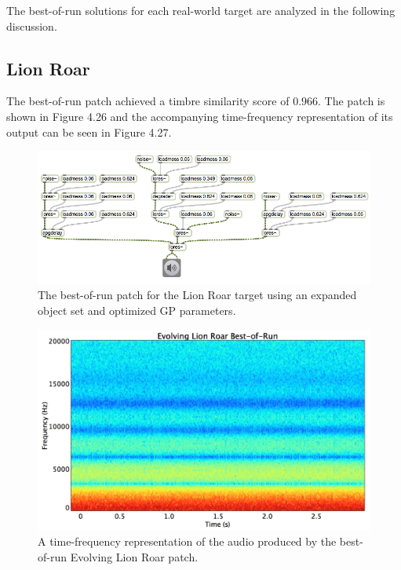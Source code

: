 \documentclass[a4paper,12pt]{report} 	%
\numberwithin{figure}{chapter}
\numberwithin{table}{chapter}
\numberwithin{equation}{chapter}
\begin{document}
\begin{flushleft}
The best-of-run solutions for each real-world target are analyzed in the following discussion.

\subsection{Lion Roar}

The best-of-run patch achieved a timbre similarity score of $0.966$. The patch is shown in Figure 4.26 and the accompanying time-frequency representation of its output can be seen in Figure 4.27.

\begin{figure}[h!]
\begin{center}
\includegraphics[angle = 270, scale = 0.60]{Lion_Best}
\caption[Lion Roar Best-of-Run Patch]{The best-of-run patch for the Lion Roar target using an expanded object set and optimized GP parameters.}
\end{center}
\end{figure}
\begin{figure}[h!]
\begin{center}
\includegraphics[scale=0.35,width=\linewidth]{EvolvingLionRoarBestOfRunSTFT}
\caption[Best-of-Run Evolving Lion Roar Time-Frequency Representation]{A time-frequency representation of the audio produced by the best-of-run Evolving Lion Roar patch.}

\end{center}
\end{figure}
\end{flushleft}
\end{document}
